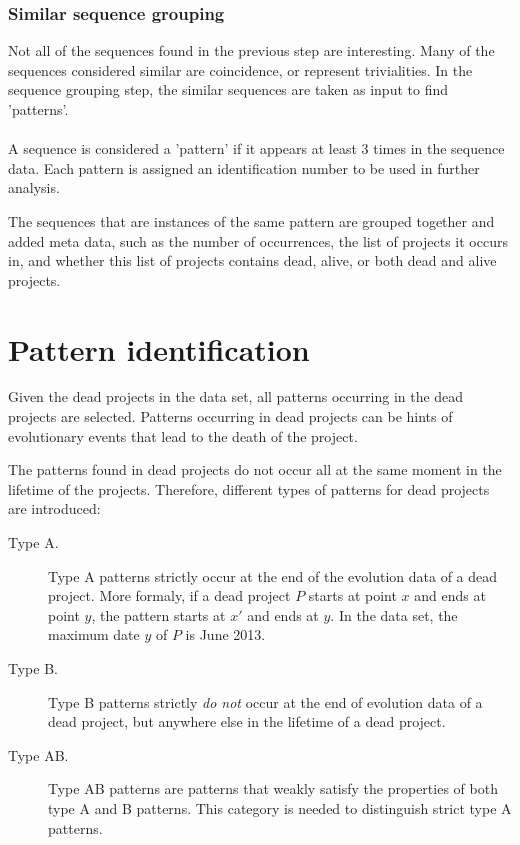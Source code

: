 \subsubsection{Similar sequence grouping}
\label{def:pattern}
Not all of the sequences found in the previous step are interesting. Many of
the sequences considered similar are coincidence, or represent trivialities. In
the sequence grouping step, the similar sequences are taken as input to find
'patterns'.

\paragraph{}
A sequence is considered a 'pattern' if it appears at least 3 times in the
sequence data. Each pattern is assigned an identification number to be used in
further analysis.

The sequences that are instances of the same pattern are grouped together and
added meta data, such as the number of occurrences, the list of projects
it occurs in, and whether this list of projects contains dead, alive, or both
dead and alive projects.

\section{Pattern identification}
\label{section:patterns_dead}
Given the dead projects in the data set, all patterns occurring in the dead
projects are selected. Patterns occurring in dead projects can be hints of
evolutionary events that lead to the death of the project.

The patterns found in dead projects do not occur all at the same moment in the
lifetime of the projects. Therefore, different types of patterns for dead
projects are introduced:

\begin{description}
	\item[Type A.] Type A patterns strictly occur at the end of the evolution data
		of a dead project. More formaly, if a dead project $P$ starts at point $x$ and
		ends at point $y$, the pattern starts at $x'$ and ends at $y$. In the data
		set, the maximum date $y$ of $P$ is June 2013.
	
	\item[Type B.] Type B patterns strictly \emph{do not }\rm occur at the end of
		evolution data of a dead project, but anywhere else in the lifetime of a dead
		project.
	
	\item[Type AB.] Type AB patterns are patterns that weakly satisfy the
		properties of both type A and B patterns. This category is needed to
		distinguish strict type A patterns.
\end{description}

